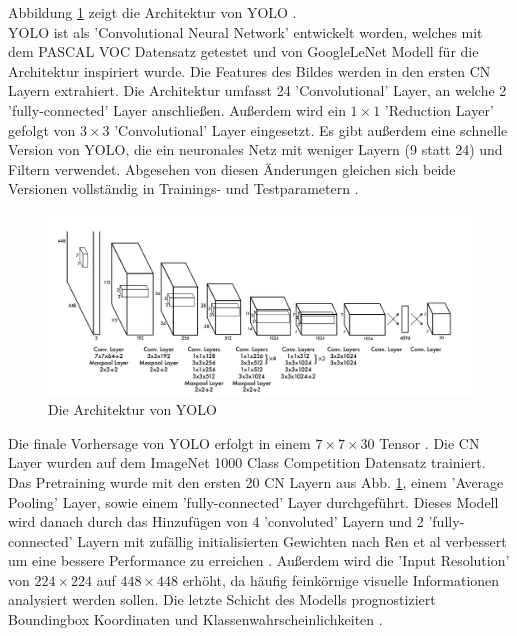 {{	Abbildung \ref{YOLO_Architecture} zeigt die Architektur von YOLO \citep{Plastiras2018}. \\
	YOLO ist als 'Convolutional Neural Network' entwickelt worden, welches mit dem PASCAL VOC Datensatz getestet und von GoogleLeNet Modell für die Architektur inspiriert wurde. Die Features des Bildes werden in den ersten CN Layern extrahiert. Die Architektur umfasst 24 'Convolutional' Layer, an welche 2 'fully-connected' Layer anschließen. Außerdem wird ein $1 \times 1$ 'Reduction Layer' gefolgt von $3 \times 3$ 'Convolutional' Layer eingesetzt. Es gibt außerdem eine schnelle Version von YOLO, die ein neuronales Netz mit weniger Layern (9 statt 24) und Filtern verwendet. Abgesehen von diesen Änderungen gleichen sich beide Versionen vollständig in Trainings- und Testparametern \citep{Plastiras2018}. \\
	\begin{figure}[h]
		\centering
		\includegraphics*[scale = 1.5, keepaspectratio]{images/YOLO/YOLO_network_arch.png}
		\caption[Die Architektur von YOLO]{Die Architektur von YOLO\citep{Plastiras2018}}
		\label{YOLO_Architecture}
 	\end{figure}
	Die finale Vorhersage von YOLO erfolgt in einem $7 \times 7 \times 30$ Tensor \citep{Plastiras2018}.
	Die CN Layer wurden auf dem \glqq ImageNet 1000 Class Competition \grqq{} Datensatz trainiert. Das Pretraining wurde mit den ersten 20 CN Layern aus Abb. \ref{YOLO_Architecture}, einem 'Average Pooling' Layer, sowie einem 'fully-connected' Layer durchgeführt. Dieses Modell wird danach durch das Hinzufügen von 4 'convoluted' Layern und 2 'fully-connected' Layern mit zufällig initialisierten Gewichten nach Ren et al  verbessert um eine bessere Performance zu erreichen . Außerdem wird die 'Input Resolution' von $224 \times 224$ auf $448  \times  448$ erhöht, da häufig feinkörnige visuelle Informationen analysiert werden sollen. Die letzte Schicht des Modells prognostiziert Boundingbox Koordinaten und Klassenwahrscheinlichkeiten \citep{Plastiras2018}. \\
}}
